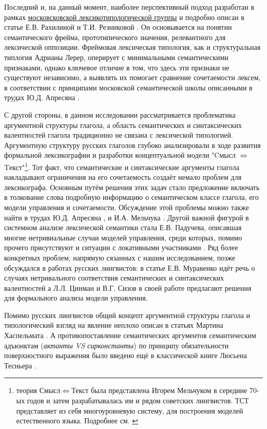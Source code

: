 \begin{enumerate*}[itemjoin={\hskip3mm},after=\hskip3mm,before=\hskip3mm]
    \item Последний и, на данный момент, наиболее перспективный подход разработан в рамках \hyperlink{mlext}{московсковской лексикотипологической группы} и подробно описан в статье Е.В. Рахилиной и Т.И. Резниковой \citep{rakhilina2016frame}. Он основывается на понятии семантического фрейма, прототипического значения, релевантного для лексической оппозиции. Фреймовая лексическая типология, как и структуральная типлогия Адрианы Лерер, оперирует с минимальными семантическими признаками, однако ключевое отличие в том, что здесь эти признаки не существуют независимо, а выявлять их помогает сравнение сочетаемости лексем, в соответствии с принципами московской семантической школы описанными в трудах Ю.Д. Апресяна  \citep{апресян1995избранные}.
\end{enumerate*}
С другой стороны, в данном исследовании рассматривается проблематика аргументной структуры глагола, а область семантических и синтаксических валентностей глагола традиционно не связана с лексической типологией. Аргументную структуру русских глаголов глубоко анализировали в ходе развития формальной лексикографии и разработки концептуальной модели "Cмысл $\Leftrightarrow$ Tекст"\footnote{теория Смысл$\Leftrightarrow$Текст была представлена Игорем Мельчуком в середине 70-ых годов и затем разрабатывалась им и рядом советских лингвистов. ТСТ представляет из себя многоуровневую систему, для построения моделей естественного языка. Подробнее см. \citep{мельчук1974опыт}}. Тот факт, что семантические и синтаксические аргументы глагола накладывают ограничения на его сочетаемость создаёт немало проблем для лексикографа. Основным путём решения этих задач стало предложение включать в толкование слова подробную информацию о семантическом классе глагола, его модели управления и сочетаемости. Обсуждение этой проблемы можно также найти в трудах Ю.Д. Апресяна \citep[119-156]{апресян1995избранные}, \citep[129-131]{апресян1995избранные2} и И.А. Мельчука \citep[134–139]{мельчук1974опыт}. Другой важной фигурой в системном анализе лексической семантики стала Е.В. Падучева, описавшая многие нетривиальные случаи моделей управления, среди которых, помимо прочего присутствуют и ситуации с локативными участниками \citep{падучева2004динамические, падучева2012неопределенно}. Ряд более конкретных проблем, напрямую сязанных с нашим исследованием, позже обсуждался в работах русских лингвистов: в статье Е.В. Муравенко  \citep{муравенко1998случаях} идёт речь о случаях нетривального соответствия семантических и синтаксических валентностей а Л.Л. Цинман и В.Г. Сизов \citep{цинман1998модель} в своей работе предлагают решения для формального анализа модели управления. 
\par Помимо русских лингвистов общий концепт аргументной структуры глагола и типологический взгляд на явление неплохо описан в статьях Мартина Хаспельмата \citep{haspelmath2004valency, haspelmath2015comparing}. А противопоставление семантических аргументов семантическим адъюнктам (\textit{актанты VS сирконстанты}) по принципу обязательности поверхностного выражения было введено ещё в классической книге Люсьена Тесньера \citep{tesniere1959elements}.

